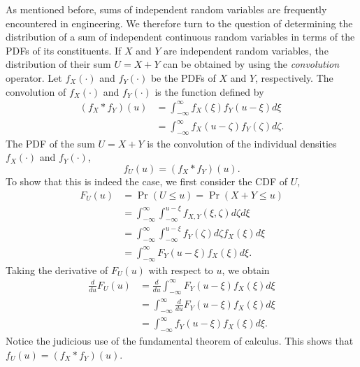 As mentioned before, sums of independent random variables are frequently encountered in engineering.
We therefore turn to the question of determining the distribution of a sum of independent continuous random variables in terms of the PDFs of its constituents.
If $X$ and $Y$ are independent random variables, the distribution of their sum $U = X + Y$ can be obtained by using the \emph{convolution} operator. 
Let $f_X (\cdot)$ and $f_Y (\cdot)$ be the PDFs of $X$ and $Y$, respectively.
The convolution of $f_X(\cdot)$ and $f_Y(\cdot)$ is the function defined by
\begin{equation*}
\begin{split}
(f_X \ast f_Y) (u)
&= \int_{-\infty}^{\infty} f_X(\xi) f_Y(u - \xi) d\xi \\
&= \int_{-\infty}^{\infty} f_X(u - \zeta) f_Y(\zeta) d\zeta .
\end{split}
\end{equation*}
The PDF of the sum $U = X + Y$ is the convolution of the individual densities $f_X(\cdot)$ and $f_Y(\cdot)$,
\begin{equation*}
f_U (u) = (f_X \ast f_Y) (u) .
\end{equation*}
To show that this is indeed the case, we first consider the CDF of $U$,
\begin{equation*}
\begin{split}
F_U (u) &= \Pr (U \leq u) = \Pr (X + Y \leq u) \\
&= \int_{-\infty}^{\infty} \int_{-\infty}^{u - \xi} f_{X,Y} (\xi, \zeta) d\zeta d\xi \\
&= \int_{-\infty}^{\infty} \int_{-\infty}^{u - \xi} f_Y (\zeta) d\zeta f_X (\xi) d\xi \\
&= \int_{-\infty}^{\infty} F_Y (u - \xi) f_X(\xi) d\xi .
\end{split}
\end{equation*}
Taking the derivative of $F_U (u)$ with respect to $u$, we obtain
\begin{equation*}
\begin{split}
\frac{d}{du} F_U (u)
&= \frac{d}{du} \int_{-\infty}^{\infty} F_Y (u - \xi) f_X(\xi) d\xi \\
&= \int_{-\infty}^{\infty} \frac{d}{du} F_Y (u - \xi) f_X(\xi) d\xi \\
&= \int_{-\infty}^{\infty} f_Y (u - \xi) f_X(\xi) d\xi .
\end{split}
\end{equation*}
Notice the judicious use of the fundamental theorem of calculus.
This shows that $f_U(u) = (f_X \ast f_Y) (u)$.

